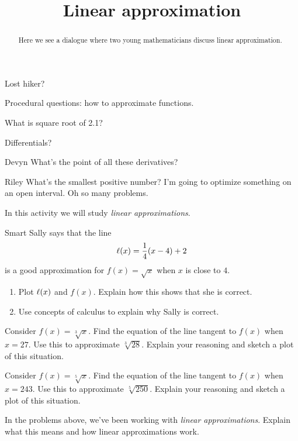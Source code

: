 \documentclass{ximera}
\title[Break-Ground:]{Linear approximation}
\begin{document}
\begin{abstract}
Here we see a dialogue where two young mathematicians discuss linear approximation.
\end{abstract}
\maketitle

Lost hiker?

Procedural questions: how to approximate functions.

What is square root of 2.1?

Differentials?

\begin{dialogue}
\item[Devyn] 
What's the point of all these derivatives?
\item[Riley]
What's the smallest positive number?
I'm going to optimize something on an open interval.  Oh so many problems.
\end{dialogue}


In this activity we will study \textit{linear approximations}. 

\begin{problem}
Smart Sally says that the line
\[
\ell(x) = \frac{1}{4}(x-4)+2
\]
is a good approximation for $f(x) = \sqrt{x}$ when $x$ is close to
$4$. 
\begin{enumerate}
\item Plot $\ell(x)$ and $f(x)$. Explain how this shows that she is
correct.
\item Use concepts of calculus to explain why Sally is correct. 
\end{enumerate}
\end{problem}

\begin{problem}
Consider $f(x) = \sqrt[3]{x}$. Find the equation of the line tangent
to $f(x)$ when $x= 27$. Use this to approximate
$\sqrt[3]{28}$. Explain your reasoning and sketch a plot of this
situation.
\end{problem}

\begin{problem}
Consider $f(x) = \sqrt[5]{x}$. Find the equation of the line tangent
to $f(x)$ when $x= 243$. Use this to approximate
$\sqrt[5]{250}$. Explain your reasoning and sketch a plot of this
situation.
\end{problem}

\begin{problem}
In the problems above, we've been working with \textit{linear
approximations}. Explain what this means and how linear approximations
work.
\end{problem}
\end{document}
